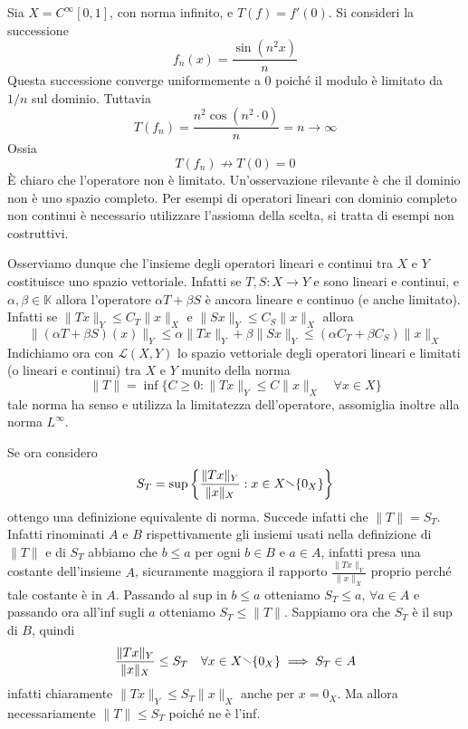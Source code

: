 \begin{example}

    Sia \(X = C^{\infty}[0,1]\), con norma infinito, e \(T(f) = f'(0)\). Si consideri la successione
    \[f_n (x) = \frac{\sin(n^2 x)}{n}\]
    Questa successione converge uniformemente a \(0\) poiché il modulo è limitato da \(1/n\) sul dominio.
    Tuttavia 
    \[T(f_n) = \frac{n^2 \cos (n^2 \cdot 0)}{n} = n \rightarrow \infty\]
    Ossia 
    \[T(f_n) \not\rightarrow T(0) = 0\]
    È chiaro che l'operatore non è limitato. 
    Un'osservazione rilevante è che il dominio non è uno spazio completo. Per esempi di operatori lineari con dominio completo 
    non continui è necessario utilizzare l'assioma della scelta, si tratta di esempi non costruttivi.
    
\end{example}

Osserviamo dunque che l'insieme degli operatori lineari e continui tra \(X\)  e
\(Y\)  costituisce uno spazio vettoriale. Infatti se \(T, S : X \to Y\) e sono
lineari e continui, e \(\alpha, \beta \in \mathbb{K}\) allora l'operatore
\(\alpha T + \beta S\) è ancora lineare e continuo (e anche limitato). Infatti
se \(\|Tx\|_Y \le C_T\|x\|_X\) e \(\|Sx\|_Y \le C_S\|x\|_X\) allora
\[
  \|(\alpha T + \beta S){(x)}\|_Y \le \alpha\|Tx\|_Y + \beta\|Sx\|_Y \le
  (\alpha C_T + \beta C_S)\|x\|_X
\]
Indichiamo ora con \(\mathcal{L}{(X, Y)}\) lo spazio vettoriale degli operatori
lineari e limitati (o lineari e continui) tra \(X\) e \(Y\) munito della norma
\begin{equation}\label{eq:opnorm_inf}
    \|T\| = \inf \{C \ge 0: \|Tx\|_Y \le C\|x\|_X \quad \forall x \in X\}
\end{equation}
tale norma ha senso e utilizza la limitatezza dell'operatore, assomiglia inoltre
alla norma \(L^{\infty}\).

Se ora considero 
\[
    S_T = \sup \left\{ \frac{\|Tx\|_Y}{\|x\|_X} : x \in X \sminus \{0_X\} \right\}
\]
ottengo una definizione equivalente di norma. Succede infatti che \(\|T\| =
S_T\). Infatti rinominati \(A\) e \(B\) rispettivamente gli insiemi usati nella
definizione di \(\|T\|\) e di \(S_T\) abbiamo che \(b \le a\) per ogni \(b \in
B\) e \(a \in A\), infatti presa una costante dell'insieme \(A\), sicuramente
maggiora il rapporto \(\frac{\|Tx\|_Y}{\|x\|_X}\) proprio perché tale costante è
in \(A\). Passando al sup in \(b \le a\) otteniamo \(S_T \le a\), \(\forall a
\in A\) e passando ora all'inf sugli \(a\) otteniamo \(S_T \le \|T\|\). Sappiamo
ora che \(S_T\) è il sup di \(B\), quindi 
\[
    \frac{\|Tx\|_Y}{\|x\|_X} \le S_T \quad \forall x \in X \sminus \{0_X\}
    \implies S_T \in A
\]
infatti chiaramente \(\|Tx\|_Y \le S_T \|x\|_X\) anche per \(x = 0_X\). Ma
allora necessariamente \(\|T\| \le S_T\) poiché ne è l'inf.


